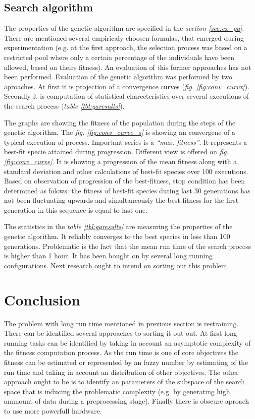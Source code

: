 \documentclass[a4paper]{IEEEtran}
\begin{document}
\subsection{Search algorithm}
The properties of the genetic algorithm are specified in the \textit{section
\ref{sec:ex_ga}}. There are mentioned several empiricaly choosen formulas, that
emerged during experimentation (e.g. at the first approach, 
the selection process was based on a restricted pool where only a certain 
percentage of the individuals have been allowed, based on theirs fitness).
An evaluation of this former approaches has not been performed.
Evaluation of the genetic algorithm was performed by two aproaches. 
At first it is projection of a convergence curves (\textit{fig. \ref{fig:conv_curvx}}). 
Secondly it is computation of statistical charecteristics over
several executions of the search process (\textit{table \ref{tbl:garesults}}).

The graphs are showing the fitness of the population during the steps of the 
genetic algorithm. The \textit{fig. \ref{fig:conv_curve_s}} is showing an convergene of a
typical execution of process. Important series is a \textit{``max. fitness''}. It represents
a best-fit specie attained during progression. Different view is offered on \textit{fig.
\ref{fig:conv_curve}}. It is showing a progression of the mean fitness along with a
standard deviation and other calculations of best-fit species over 100 executions. 
Based on observation of progression of the best-fitness, stop condition has been
determined as folows:
the fitness of best-fit species during last 30 generations has not been fluctuating upwards 
and simultaneously the best-fitness for the first generation in this sequence is equal to last
one.

The statistics in the \textit{table \ref{tbl:garesults}} are measuring the properties of
the genetic algorithm. It reliably converges to the best species in less than 100 generations.
Problematic is the fact that the mean run time of the search process is higher than
1 hour. It has been bought on by several long running configurations. 
Next research ought to intend on sorting out this problem.

\section{Conclusion}
The problem with long run time mentioned in previous section is restraining. 
There can be identified several
approaches to sorting it out out.
At first long running tasks can be identified by taking in account an asymptotic
complexity of the fitness computation process.
As the run time is one of core objectives the fitness can be estimated or 
represented by an fuzzy number by estimating of the run time and taking in account an
distribution of other objectives.
The other approach ought to be is to identify an parameters of the subspace of the search space that is inducing the problematic complexity (e.g. by generating high ammount of data during a preprocessing stage).
Finally there is obscure aproach to use more powerfull hardware.
\end{document}
